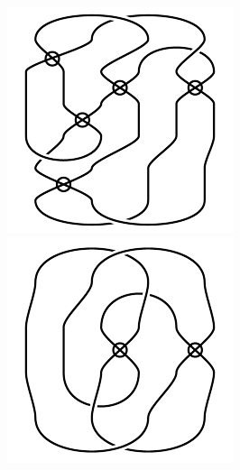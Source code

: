\begin{figure}[H]
\begin{minipage}[b]{.18\linewidth}
\centering
\includegraphics[width=\linewidth]{../data/virtual_4_22.png}
\end{minipage}
\begin{minipage}[b]{.18\linewidth}
\centering
\includegraphics[width=\linewidth]{../data/virtual_4_23.png}

\end{minipage}
\end{figure}
